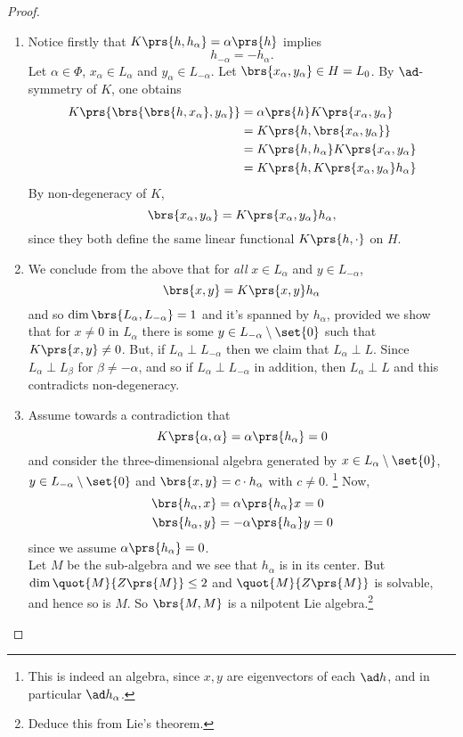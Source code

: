 \documentclass[10pt,a4paper,twoside,openany,hidelinks]{book}
\begin{document}
\begin{proof}
\begin{enumerate}
\item
Notice firstly that $K\prs{h,h_{\alpha}} = \alpha\prs{h}$ implies
\begin{equation} \label{functional:negative}
h_{-\alpha} = -h_{\alpha}\text{.}
\end{equation}
Let $\alpha \in \Phi$, $x_{\alpha} \in L_{\alpha}$ and $y_{\alpha} \in L_{-\alpha}$. Let $\brs{x_{\alpha},y_{\alpha}} \in H = L_0$.
By $\ad$-symmetry of $K$, one obtains
\begin{align*}
K\prs{\brs{\brs{h, x_{\alpha}}, y_{\alpha}}} &= \alpha\prs{h} K\prs{x_{\alpha},y_{\alpha}} \\&= K\prs{h,\brs{x_{\alpha},y_{\alpha}}} \\&= K\prs{h,h_{\alpha}} K\prs{x_{\alpha},y_{\alpha}} \\&= K\prs{h,K\prs{x_{\alpha},y_{\alpha}}h_{\alpha}}
\end{align*}
By non-degeneracy of $K$,
\[\brs{x_{\alpha},y_{\alpha}} = K\prs{x_{\alpha}, y_{\alpha}} h_{\alpha}\text{,}\]
since they both define the same linear functional $K\prs{h,\cdot}$ on $H$.\\
\item
We conclude from the above that for \emph{all} $x \in L_{\alpha}$ and $y \in L_{-\alpha}$, \[\brs{x,y} = K\prs{x,y}h_{\alpha}\]
and so $\dim\brs{L_{\alpha}, L_{-\alpha}} = 1$ and it's spanned by $h_{\alpha}$, provided we show that for $x \neq 0$ in $L_{\alpha}$ there is some $y \in L_{-\alpha} \setminus \set{0}$ such that $K\prs{x,y} \neq 0$. But, if $L_{\alpha} \perp L_{-\alpha}$ then we claim that $L_{\alpha} \perp L$. Since $L_{\alpha} \perp L_{\beta}$ for $\beta \neq -\alpha$, and so if $L_{\alpha} \perp L_{-\alpha}$ in addition, then $L_{\alpha} \perp L$ and this contradicts non-degeneracy.
\item
Assume towards a contradiction that
\[K\prs{\alpha,\alpha} = \alpha\prs{h_{\alpha}} = 0\]
and consider the three-dimensional algebra generated by $x \in L_{\alpha} \setminus \set{0}$, $y \in L_{-\alpha} \setminus \set{0}$ and $\brs{x,y} = c\cdot h_{\alpha}$ with $c \neq 0$.%
\footnote{This is indeed an algebra, since $x,y$ are eigenvectors of each $\ad h$, and in particular $\ad h_{\alpha}$.}
Now,
\begin{align*}
\brs{h_{\alpha}, x} &= \alpha\prs{h_{\alpha}} x = 0 \\
\brs{h_{\alpha}, y} &= -\alpha\prs{h_{\alpha}}y = 0
\end{align*}
since we assume $\alpha\prs{h_{\alpha}} = 0$.\\
Let $M$ be the sub-algebra and we see that $h_{\alpha}$ is in its center. But $\dim \quot{M}{Z\prs{M}} \leq 2$ and $\quot{M}{Z\prs{M}}$ is solvable, and hence so is $M$. So $\brs{M,M}$ is a nilpotent Lie algebra.\footnote{Deduce this from Lie's theorem.}

\end{enumerate}
\end{proof}
\end{document}
